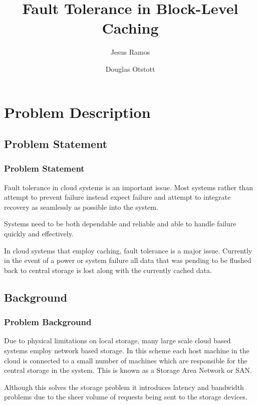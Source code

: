 \documentclass{beamer}
\title{Fault Tolerance in Block-Level Caching}
\author{
  Jesus Ramos \and
  Douglas Otstott
}
\institute[FIU]{Florida International University}
\date{}
\begin{document}
\maketitle

\section{Problem Description}

\subsection{Problem Statement}

\begin{frame}
  \frametitle{Problem Statement}

  Fault tolerance in cloud systems is an important issue. Most systems
  rather than attempt to prevent failure instead expect failure and
  attempt to integrate recovery as seamlessly as possible into the
  system.

  Systems need to be both dependable and reliable and able to handle
  failure quickly and effectively.

  In cloud systems that employ caching, fault tolerance is a major
  issue. Currently in the event of a power or system failure all data
  that was pending to be flushed back to central storage is lost along
  with the currently cached data.

\end{frame}


\subsection{Background}

\begin{frame}
  \frametitle{Problem Background}

  Due to physical limitations on local storage, many large scale cloud
  based systems employ network based storage. In this scheme each host
  machine in the cloud is connected to a small number of machines
  which are responsible for the central storage in the system. This is
  known as a Storage Area Network or SAN.

  Although this solves the storage problem it introduces latency and
  bandwidth problems due to the sheer volume of requests being sent to
  the storage devices.

\end{frame}
\end{document}
